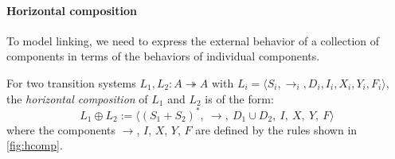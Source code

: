 \documentclass[sigplan,10pt,review]{acmart}
\begin{document}

\paragraph{Horizontal composition} \label{sec:sem:linker} %

To model linking,
we need to express the external behavior
of a collection of components
in terms of the behaviors of
individual components.

\begin{definition} \label{def:hcomp} %
For two transition systems $L_1, L_2 : A \twoheadrightarrow A$
with
$L_i = \langle S_i, {\rightarrow}_i, D_i, I_i, X_i, Y_i, F_i \rangle$,
the \emph{horizontal composition} of $L_1$ and $L_2$
is of the form:
\[
    L_1 \oplus L_2 :=
    \big\langle
      (S_1 + S_2)^*, \: {\rightarrow}, \:
      D_1 \cup D_2, \:
      I, \: X, \: Y, \: F
    \big\rangle
\]
where the components $\rightarrow$, $I$, $X$, $Y$, $F$
are defined by
the rules shown in \autoref{fig:hcomp}.
\end{definition}
\end{document}
